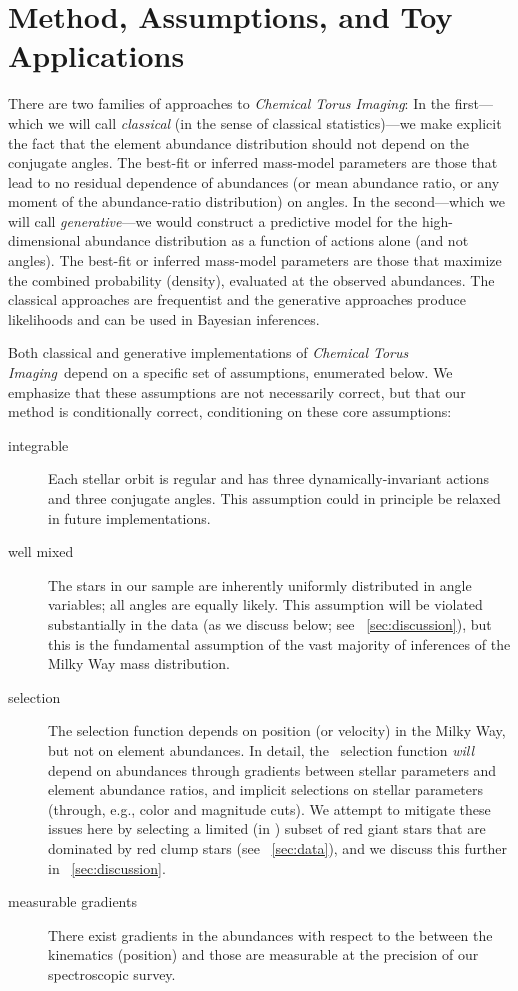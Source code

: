 \documentclass[modern]{aastex63}
\newcommand{\methodname}{\textsl{Chemical Torus Imaging}}
\newcommand{\apogee}{\acronym{APOGEE}}
\begin{document}
\section{Method, Assumptions, and Toy Applications}
\label{sec:inferences}

There are two families of approaches to \methodname:
In the first---which we will call \emph{classical} (in the sense of classical
statistics)---we make explicit the fact that the element abundance distribution
should not depend on the conjugate angles.
The best-fit or inferred mass-model parameters are those that lead to no
residual dependence of abundances (or mean abundance ratio, or any moment of the
abundance-ratio distribution) on angles.
In the second---which we will call \emph{generative}---we would construct a
predictive model for the high-dimensional abundance distribution as a function
of actions alone (and not angles).
The best-fit or inferred mass-model parameters are those that maximize the
combined probability (density), evaluated at the observed abundances.
The classical approaches are frequentist and the generative approaches produce
likelihoods and can be used in Bayesian inferences.

Both classical and generative implementations of \methodname\ depend on a
specific set of assumptions, enumerated below.
We emphasize that these assumptions are not necessarily correct, but that our
method is conditionally correct, conditioning on these core assumptions:
\begin{description}
\item[integrable] Each stellar orbit is regular and has three
  dynamically-invariant actions and three conjugate angles. This assumption
  could in principle be relaxed in future implementations.
\item[well mixed] The stars in our sample are inherently uniformly distributed
  in angle variables; all angles are equally likely. This assumption will be
  violated substantially in the data (as we discuss below; see
  \sectionname~\ref{sec:discussion}), but this is the fundamental assumption of
  the vast majority of inferences of the Milky Way mass distribution.
\item[selection] The selection function depends on position (or velocity) in the
  Milky Way, but not on element abundances. In detail, the \apogee\ selection
  function \emph{will} depend on abundances through gradients between stellar
  parameters and element abundance ratios, and implicit selections on stellar
  parameters (through, e.g., color and magnitude cuts). We attempt to mitigate
  these issues here by selecting a limited (in \logg) subset of red giant stars
  that are dominated by red clump stars (see \sectionname~\ref{sec:data}), and
  we discuss this further in \sectionname~\ref{sec:discussion}.
\item[measurable gradients] There exist gradients in the abundances with respect to the between the kinematics (position) and those are measurable at the precision of our spectroscopic survey.
\end{description}
\end{document}
